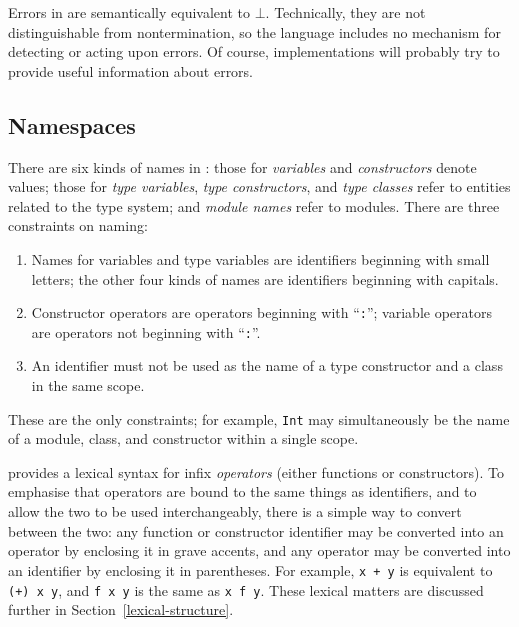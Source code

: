 Errors in \Haskell{} are semantically equivalent to
$\bot$.  Technically, they are not distinguishable
from nontermination, so the language includes no mechanism
for detecting or acting upon errors.  Of course, implementations
will probably try to provide useful information about
errors.

\subsection{Namespaces}
\label{namespaces}

There are six kinds of names in \Haskell{}: those for {\em variables} and
{\em constructors} denote values; those for {\em type variables}, {\em
type constructors}, and {\em type classes} refer to entities related
to the type system; and {\em module names} refer to modules.
There are three constraints on naming:\nopagebreak[4]
\begin{enumerate}
\item Names for variables and type variables are identifiers beginning
      with small letters; the other four kinds of names are
      identifiers beginning with capitals.
\item Constructor operators are operators beginning with ``\mbox{\tt :}'';
      variable operators are operators not beginning with ``\mbox{\tt :}''.
\item An identifier must not be used as the name of a type constructor
      and a class in the same scope.
\end{enumerate}
These are the only constraints; for example,
\mbox{\tt Int} may simultaneously be the name of a module, class, and constructor
within a single scope.

\Haskell{} provides a lexical syntax for infix {\em
operators} (either functions or constructors).  To emphasise
that operators are bound to the same things as identifiers, and to
allow the two to be used interchangeably, there is a simple way to
convert between the two: any function or constructor identifier may be
converted into an operator by enclosing it in grave accents, and any
operator may be converted into an identifier by enclosing it in
parentheses.  For example, \mbox{\tt x\ +\ y} is equivalent to
\mbox{\tt (+)\ x\ y}, and \mbox{\tt f\ x\ y} is the same as
\mbox{\mbox{\tt x} \bkqB\mbox{\tt f}\bkqA\mbox{\tt \ y}}.
These lexical matters are discussed further in
Section~\ref{lexical-structure}.

